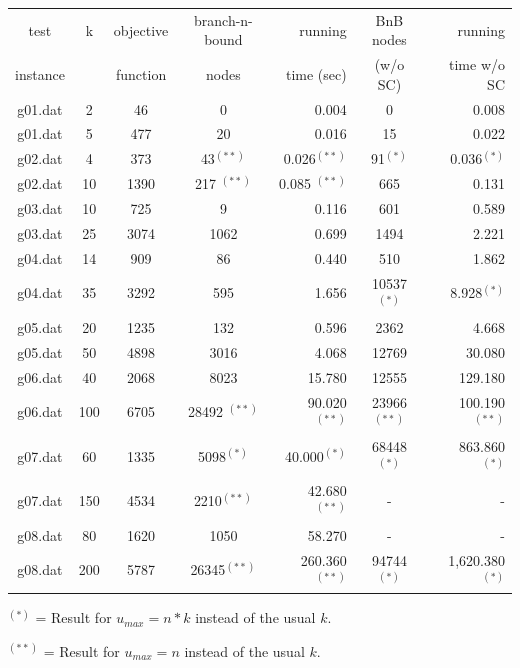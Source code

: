 \documentclass[,%
			paper=a4,%
			DIV14,
			liststotoc,
			bibtotoc,
			draft=false,%
			numbers=noendperiod
			]{scrartcl}
\begin{document}
\begin{minipage}{\linewidth} %
\begin{tabular}{||c||cccr|cr||}
\hline
test     & k & objective  & branch-n-bound & running   & BnB nodes & running\\
instance &   & function   & nodes          & time (sec)& (w/o SC)  & time w/o SC \\
\hline
g01.dat	&	2	&	46	&	0	&	0.004	&	0	&	0.008	\\
g01.dat	&	5	&	477	&	20	&	0.016	&	15	&	0.022	\\
g02.dat	&	4	&	373	&	43$^{(**)}$	&	0.026$^{(**)}$	&	91$^{(*)}$	&	0.036$^{(*)}$	\\
g02.dat	&	10	&	1390	&	217	$^{(**)}$&	0.085	$^{(**)}$&	665	&	0.131	\\
g03.dat	&	10	&	725	&	9	&	0.116	&	601	&	0.589	\\
g03.dat	&	25	&	3074	&	1062	&	0.699	&	1494	&	2.221	\\
g04.dat	&	14	&	909	&	86	&	0.440	&	510	&	1.862	\\
g04.dat	&	35	&	3292	&	595	&	1.656	&	10537$^{(*)}$	&	8.928$^{(*)}$	\\
g05.dat	&	20	&	1235	&	132	&	0.596	&	2362	&	4.668	\\
g05.dat	&	50	&	4898	&	3016	&	4.068	&	12769	&	30.080	\\
g06.dat	&	40	&	2068	&	8023	&	15.780	&	12555	&	129.180	\\
g06.dat	&	100	&	6705	&	28492	$^{(**)}$&	90.020$^{(**)}$	&	23966$^{(**)}$	&	100.190$^{(**)}$	\\
g07.dat	&	60	&	1335	&	5098$^{(*)}$	&	40.000$^{(*)}$	&	68448$^{(*)}$	&	863.860	$^{(*)}$\\
g07.dat	&	150	&	4534	&	2210$^{(**)}$	&	42.680$^{(**)}$	&	-	&	-	\\
g08.dat	&	80	&	1620	&	1050	&	58.270	&	-	&	-	\\
g08.dat	&	200	&	5787	&	26345$^{(**)}$	&	260.360$^{(**)}$	&	94744$^{(*)}$	&	1,620.380$^{(*)}$	\\
\hline
\end{tabular}

$^{(*)}$ = Result for $u_{max} = n*k$ instead of the usual $k$.


$^{(**)}$ = Result for $u_{max} = n$ instead of the usual $k$.
\end{minipage}
\end{document}
